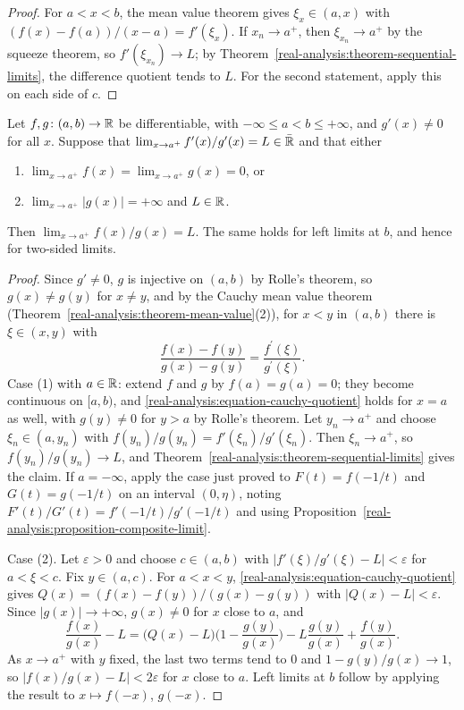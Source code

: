 \begin{proof}
For $a < x < b$, the mean value theorem gives $\xi_x \in (a, x)$ with $(f(x) - f(a))/(x - a) = f'(\xi_x)$. If $x_n \to a^+$, then $\xi_{x_n} \to a^+$ by the squeeze theorem, so $f'(\xi_{x_n}) \to L$; by
Theorem~\ref{real-analysis:theorem-sequential-limits}, the difference quotient tends to $L$. For the second statement, apply this on each side of $c$.
\end{proof}

\begin{theorem}[de l'H\^opital]\label{real-analysis:theorem-lhopital}
Let $f, g \colon (a, b) \to \mathbb{R}$ be differentiable, with $-\infty \leq a < b \leq +\infty$, and $g'(x) \neq 0$ for all $x$. Suppose that $\lim_{x \to a^+}f'(x)/g'(x) = L \in \bar{\mathbb{R}}$ and that either
\begin{enumerate}
\item $\lim_{x \to a^+}f(x) = \lim_{x \to a^+}g(x) = 0$, or
\item $\lim_{x \to a^+}|g(x)| = +\infty$ and $L \in \mathbb{R}$.
\end{enumerate}
Then $\lim_{x \to a^+}f(x)/g(x) = L$. The same holds for left limits at $b$, and hence for two-sided limits.
\end{theorem}

\begin{proof}
Since $g' \neq 0$, $g$ is injective on $(a, b)$ by Rolle's theorem, so $g(x) \neq g(y)$ for $x \neq y$, and by the Cauchy mean value theorem (Theorem~\ref{real-analysis:theorem-mean-value}(2)), for $x < y$ in $(a, b)$ there is
$\xi \in (x, y)$ with
\begin{equation}\label{real-analysis:equation-cauchy-quotient}
\frac{f(x) - f(y)}{g(x) - g(y)} = \frac{f^{\prime}(\xi)}{g^{\prime}(\xi)}.
\end{equation}
Case (1) with $a \in \mathbb{R}$: extend $f$ and $g$ by $f(a) = g(a) = 0$; they become continuous on $[a, b)$, and \eqref{real-analysis:equation-cauchy-quotient} holds for $x = a$ as well, with $g(y) \neq 0$ for $y > a$ by Rolle's theorem. Let $y_n \to a^+$ and choose
$\xi_n \in (a, y_n)$ with $f(y_n)/g(y_n) = f'(\xi_n)/g'(\xi_n)$. Then $\xi_n \to a^+$, so $f(y_n)/g(y_n) \to L$, and Theorem~\ref{real-analysis:theorem-sequential-limits} gives the claim. If $a = -\infty$, apply the case just
proved to $F(t) = f(-1/t)$ and $G(t) = g(-1/t)$ on an interval $(0, \eta)$, noting $F'(t)/G'(t) = f'(-1/t)/g'(-1/t)$ and using Proposition~\ref{real-analysis:proposition-composite-limit}.

Case (2). Let $\varepsilon > 0$ and choose $c \in (a, b)$ with $|f'(\xi)/g'(\xi) - L| < \varepsilon$ for $a < \xi < c$. Fix $y \in (a, c)$. For $a < x < y$, \eqref{real-analysis:equation-cauchy-quotient} gives $Q(x) = (f(x) - f(y))/(g(x) - g(y))$ with $|Q(x) - L| < \varepsilon$. Since
$|g(x)| \to +\infty$, $g(x) \neq 0$ for $x$ close to $a$, and
\[
\frac{f(x)}{g(x)} - L = \big(Q(x) - L\big)\Big(1 - \frac{g(y)}{g(x)}\Big) - L\frac{g(y)}{g(x)} + \frac{f(y)}{g(x)}.
\]
As $x \to a^+$ with $y$ fixed, the last two terms tend to $0$ and $1 - g(y)/g(x) \to 1$, so $|f(x)/g(x) - L| < 2\varepsilon$ for $x$ close to $a$. Left limits at $b$ follow by applying the result to $x \mapsto f(-x)$, $g(-x)$.
\end{proof}

